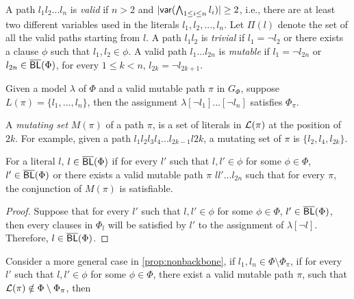 A path $l_1l_2...l_n$ is \emph{valid} if $n>2$ and $|\textsf{var}(\bigwedge_{1\leq i\leq n} l_i)|\geq 2$, i.e., there are at least two different variables used in
the literals  $l_1,l_2,...,l_n$. Let $\Pi(l)$ denote the set of all the valid paths starting from $l$.
A path $l_1l_2$ is \emph{trivial} if $l_1=\neg l_2$ or there exists a clause $\phi$ such that $l_1,l_2\in\phi$.
A valid path $l_1...l_{2n}$ is \emph{mutable} if $l_1=\neg l_{2n}$ or $l_{2n}\in\overline{\textsf{BL}}(\Phi)$, for every $1\leq k < n$, $l_{2k}=\neg l_{2k+1}$.

\begin{proposition}
Given a model $\lambda$ of $\Phi$ and a valid mutable path $\pi$ in $G_\Phi$,
suppose $L(\pi)=\{l_1,...,l_n\}$,  then the assignment $\lambda[\neg l_1]...[\neg l_n]$ satisfies $\Phi_\pi$.
\end{proposition}

 A \emph{mutating set} $M(\pi)$ of a path $\pi$, is a set of literals in ${\cal L}(\pi)$ at the position of $2k$. For example, given a path $l_1l_2l_3l_4...l_{2k-1}l{2k}$, a mutating set of $\pi$ is $\{l_2, l_4, l_{2k}\}$.
 
 For a literal $l$, $l\in\overline{\textsf{BL}}(\Phi)$ if for every $l'$ such that $l,l'\in\phi$ for some $\phi\in\Phi$, $l'\in\overline{\textsf{BL}}(\Phi)$ or there exists a valid mutable path $\pi$ $ll'...l_{2n}$ such that for every $\pi$, the conjunction of $M(\pi)$ is satisfiable.
 
 \begin{proof}
 Suppose that for every $l'$ such that $l,l'\in\phi$ for some $\phi\in\Phi$, $l'\in\overline{\textsf{BL}}(\Phi)$, then every clauses in $\Phi_l$ will be satisfied by $l'$ to the assignment of $\lambda[\neg l]$. Therefore, $l\in\overline{\textsf{BL}}(\Phi)$.
 
 \end{proof}






 Consider a more general case in \ref{prop:nonbackbone}, if $l_1, l_n\in\Phi\setminus\Phi_\pi$, if for every $l'$ such that $l, l'\in\phi$ for some $\phi\in\Phi$, there exist a valid mutable path $\pi$, such that ${\cal L}(\pi)\notin\Phi\setminus\Phi_\pi$, then 

